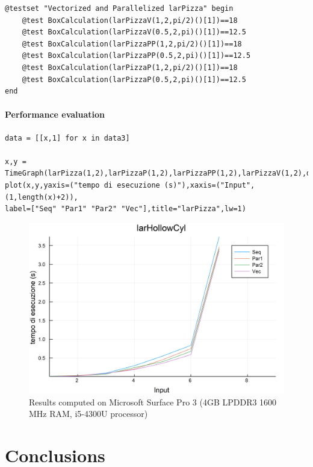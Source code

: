 \documentclass{article}
\begin{document}
\begin{Verbatim}
@testset "Vectorized and Parallelized larPizza" begin
	@test BoxCalculation(larPizzaV(1,2,pi/2)()[1])==18
	@test BoxCalculation(larPizzaV(0.5,2,pi)()[1])==12.5
	@test BoxCalculation(larPizzaPP(1,2,pi/2)()[1])==18
	@test BoxCalculation(larPizzaPP(0.5,2,pi)()[1])==12.5
	@test BoxCalculation(larPizzaP(1,2,pi/2)()[1])==18
	@test BoxCalculation(larPizzaP(0.5,2,pi)()[1])==12.5
end
\end{Verbatim}

\paragraph{Performance evaluation}

\begin{Verbatim}
data = [[x,1] for x in data3]

x,y = TimeGraph(larPizza(1,2),larPizzaP(1,2),larPizzaPP(1,2),larPizzaV(1,2),data,5)
plot(x,y,yaxis=("tempo di esecuzione (s)"),xaxis=("Input",(1,length(x)+2)),
label=["Seq" "Par1" "Par2" "Vec"],title="larPizza",lw=1)

\end{Verbatim}

\begin{figure}[htbp] 
\centering 
\includegraphics[scale=.13]{larPizzaTime.png} 
\caption{Results computed on Microsoft Surface Pro  3 (4GB LPDDR3 1600 MHz RAM, i5-4300U processor)} 
\end{figure}


\newpage
\section{Conclusions}
\end{document}
